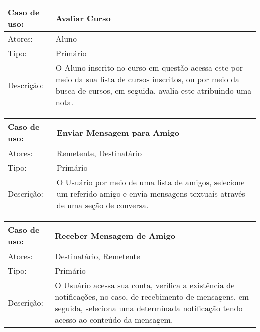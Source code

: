 \documentclass[12pt,a4paper,onecolumn,titlepage]{article}
\begin{document}
\begin{table}[h!]
\begin{center}
\begin{tabular}{p{2.5cm} p{9.5cm}}
Caso de uso: & \textbf{Avaliar Curso} \\ \hline
Atores: & Aluno \\ \hline
Tipo: & Primário \\ \hline
Descrição: & O Aluno inscrito no curso em questão acessa este por meio da sua lista de cursos inscritos, ou por meio da busca de cursos, em seguida, avalia este atribuindo uma nota.

\end{tabular}
\end{center}
\end{table}


\begin{table}[h!]
\begin{center}
\begin{tabular}{p{2.5cm} p{9.5cm}}
Caso de uso: & \textbf{Enviar Mensagem para Amigo} \\ \hline
Atores: & Remetente, Destinatário \\ \hline
Tipo: & Primário \\ \hline
Descrição: & O Usuário por meio de uma lista de amigos, selecione um referido amigo e envia mensagens textuais através de uma seção de conversa.

\end{tabular}
\end{center}
\end{table}


\begin{table}[h!]
\begin{center}
\begin{tabular}{p{2.5cm} p{9.5cm}}
Caso de uso: & \textbf{Receber Mensagem de Amigo} \\ \hline
Atores: & Destinatário, Remetente \\ \hline
Tipo: & Primário \\ \hline
Descrição: & O Usuário acessa sua conta, verifica a existência de notificações, no caso, de recebimento de mensagens, em seguida, seleciona uma determinada notificação tendo acesso ao conteúdo da mensagem.

\end{tabular}
\end{center}
\end{table}
\end{document}
